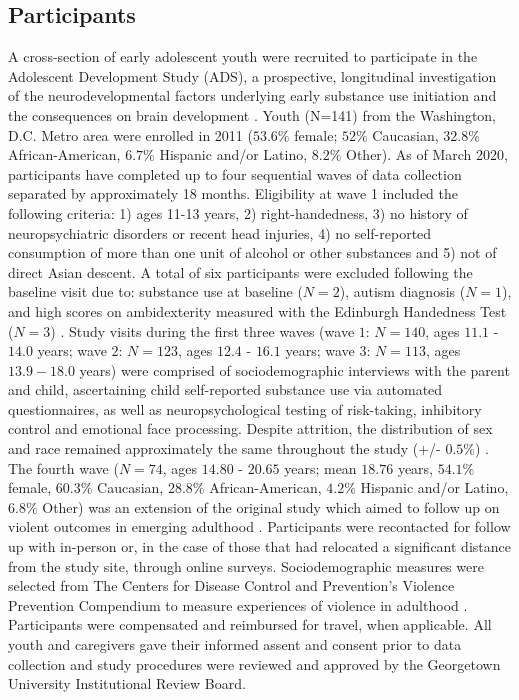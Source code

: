 \documentclass[utf8]{frontiersSCNS} %
\begin{document}
\subsection{Participants} A cross-section of early adolescent youth were recruited to participate in the Adolescent Development Study (ADS), a prospective, longitudinal investigation of the neurodevelopmental factors underlying early substance use initiation and the consequences on brain development \citep{Fishbein2016}. Youth (N=141) from the Washington, D.C. Metro area were enrolled in 2011 ($53.6\%$ female; $52\%$ Caucasian, $32.8\%$ African-American, $6.7\%$ Hispanic and/or Latino, $8.2\%$ Other). As of March 2020, participants have completed up to four sequential waves of data collection separated by approximately 18 months. Eligibility at wave 1 included the following criteria: 1) ages 11-13 years, 2) right-handedness, 3) no history of neuropsychiatric disorders or recent head injuries, 4) no self-reported consumption of more than one unit of alcohol or other substances and 5) not of direct Asian descent. A total of six participants were excluded following the baseline visit due to: substance use at baseline ($N=2$), autism diagnosis ($N=1$), and high scores on ambidexterity measured with the Edinburgh Handedness Test ($N=3$) \citep{veale2014edinburgh}. Study visits during the first three waves (wave $1$: $N=140$, ages $11.1$ - $14.0$ years; wave $2$:  $N=123$, ages $12.4$ - $16.1$ years; wave $3$: $N=113$, ages $13.9 - 18.0$ years) were comprised of sociodemographic interviews with the parent and child, ascertaining child self-reported substance use via automated questionnaires, as well as neuropsychological testing of risk-taking, inhibitory control and emotional face processing. Despite attrition, the distribution of sex and race remained approximately the same throughout the study (+/- $0.5\%$) . The fourth wave ($N=74$, ages $14.80$ - $20.65$ years; mean $18.76$ years, $54.1\%$ female, $60.3\%$ Caucasian, $28.8\%$ African-American, $4.2\%$ Hispanic and/or Latino, $6.8\%$ Other) was an extension of the original study which aimed to follow up on violent outcomes in emerging adulthood \citep{ElDamaty2016NIJ}. Participants were recontacted for follow up with in-person or, in the case of those that had relocated a significant distance from the study site, through online surveys. Sociodemographic measures were selected from The Centers for Disease Control and Prevention’s Violence Prevention Compendium to measure experiences of violence in adulthood \citep{dahlberg2005measuring}. Participants were compensated and reimbursed for travel, when applicable. All youth and caregivers gave their informed assent and consent prior to data collection and study procedures were reviewed and approved by the Georgetown University Institutional Review Board.
\end{document}

